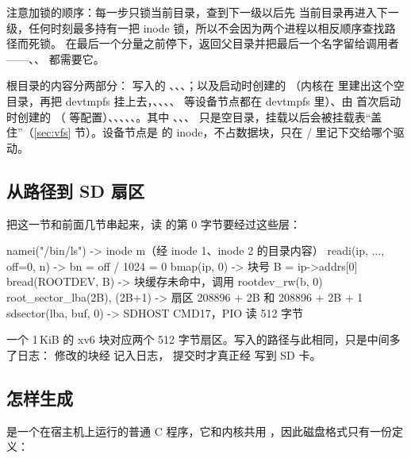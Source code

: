 注意加锁的顺序：每一步只锁当前目录，查到下一级以后先  当前目录再进入下一级，任何时刻最多持有一把 inode 锁，所以不会因为两个进程以相反顺序查找路径而死锁。 在最后一个分量之前停下，返回父目录并把最后一个名字留给调用者——、、 都需要它。

根目录的内容分两部分： 写入的 、、、；以及启动时创建的 （内核在  里建出这个空目录，再把 devtmpfs 挂上去，、、、、 等设备节点都在 devtmpfs 里）、由  首次启动时创建的 （ 等配置）、、、、、。其中 、、、 只是空目录，挂载以后会被挂载表“盖住”（\ref{sec:vfs} 节）。设备节点是  的 inode，不占数据块，只在 / 里记下交给哪个驱动。

\subsection{从路径到 SD 扇区}

把这一节和前面几节串起来，读  的第 0 字节要经过这些层：

\begin{txtcode}
namei("/bin/ls")             -> inode m（经 inode 1、inode 2 的目录内容）
readi(ip, ..., off=0, n)     -> bn = off / 1024 = 0
bmap(ip, 0)                  -> 块号 B = ip->addrs[0]
bread(ROOTDEV, B)            -> 块缓存未命中，调用 rootdev_rw(b, 0)
root_sector_lba(2B), (2B+1)  -> 扇区 208896 + 2B 和 208896 + 2B + 1
sdsector(lba, buf, 0)        -> SDHOST CMD17，PIO 读 512 字节
\end{txtcode}

一个 1\,KiB 的 xv6 块对应两个 512 字节扇区。写入的路径与此相同，只是中间多了日志： 修改的块经  记入日志， 提交时才真正经  写到 SD 卡。

\subsection{ 怎样生成 }

 是一个在宿主机上运行的普通 C 程序，它和内核共用 ，因此磁盘格式只有一份定义：

